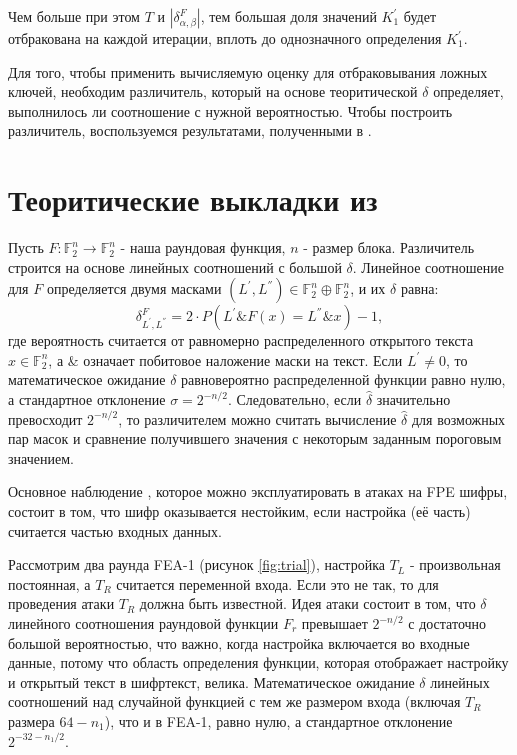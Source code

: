 \documentclass[utf8x, 14pt]{G7-32} %
\begin{document}
Чем больше при этом $T$ и $|\delta_{\alpha, \beta}^F|$, тем большая доля значений $K_1^{'}$ будет отбракована на каждой итерации, вплоть до однозначного определения $K_1^{'}$.

Для того, чтобы применить вычисляемую оценку для отбраковывания ложных ключей, необходим различитель, который на основе теоритической $\delta$ определяет, выполнилось ли соотношение с нужной вероятностью. Чтобы построить различитель, воспользуемся результатами, полученными в \cite{main_paper}.


\section{Теоритические выкладки из \cite{main_paper}}
Пусть $F: \mathbb{F}_2^n \to \mathbb{F}_2^n$ - наша раундовая функция, $n$ - размер блока. Различитель строится на основе линейных соотношений с большой $\delta$. Линейное соотношение для $F$ определяется двумя масками $(L^{'}, L^{''}) \in \mathbb{F}_2^n \oplus \mathbb{F}_2^n$, и их $\delta$ равна:
$$ \delta_{L^{'}, L^{''}}^{F} = 2\cdot P\left(L^{'} \& F(x) = L^{''} \& x\right)-1 ,$$
где вероятность считается от равномерно распределенного открытого текста  $x\in \mathbb{F}_2^n$, а \& означает побитовое наложение маски на текст. Если $L^{'} \neq 0$, то математическое ожидание $\delta$ равновероятно распределенной функции равно нулю, а стандартное отклонение $\sigma = 2^{-n/2}$. Следовательно, если $\hat{\delta}$ значительно превосходит $2^{-n/2}$, то различителем можно считать вычисление $\hat{\delta}$ для возможных пар масок и сравнение получившего значения с некоторым заданным пороговым значением.

Основное наблюдение \cite{main_paper}, которое можно эксплуатировать в атаках на FPE шифры, состоит в том, что шифр оказывается нестойким, если настройка (её часть) считается частью входных данных.


Рассмотрим два раунда FEA-1 (рисунок \ref{fig:trial}), настройка $T_L$ - произвольная постоянная, а $T_R$ считается переменной входа. Если это не так, то для проведения атаки $T_R$ должна быть известной. Идея атаки состоит в том, что $\delta$  линейного соотношения раундовой функции $F_r$ превышает $ 2^{-n/2}$ с достаточно большой вероятностью, что важно, когда настройка включается во входные данные, потому что область определения функции, которая отображает настройку и открытый текст в шифртекст, велика. Математическое ожидание $\delta$ линейных соотношений над случайной функцией с тем же размером входа (включая $T_R$ размера $64-n_1$), что и в FEA-1, равно нулю, а стандартное отклонение $2^{-32-n_1/2}$. 
\end{document}

